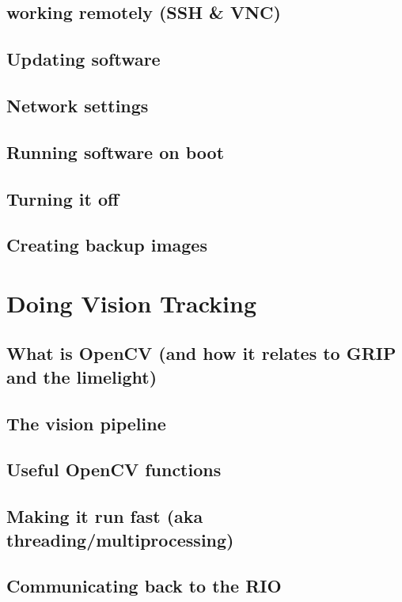 \documentclass[11pt, titlepage]{article}
\begin{document}
\subsection{working remotely (SSH \& VNC)}
\label{sec:URPI_working_remotely}
\subsection{Updating software}
\label{sec:URPI_updating_software}
\subsection{Network settings}
\label{sec:URPI_network_settings}
\subsection{Running software on boot}
\label{sec:URPI_running_software_boot}
\subsection{Turning it off}
\label{sec:URPI_shutdown}
\subsection{Creating backup images}
\label{sec:URPI_backup_images}

\section{Doing Vision Tracking}
\label{sec:vision_tracking}
\subsection{What is OpenCV (and how it relates to GRIP and the limelight)}
\label{sec:VT_what_opencv}
\subsection{The vision pipeline}
\label{sec:URPI_vision_pipeline}
\subsection{Useful OpenCV functions}
\label{sec:URPI_opencv_functions}
\subsection{Making it run fast (aka threading/multiprocessing)}
\label{sec:URPI_run_fast}
\subsection{Communicating back to the RIO}
\label{sec:URPI_communication}
\end{document}
